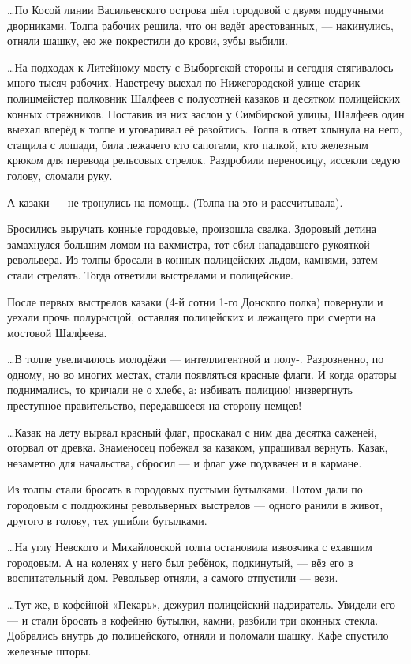…По Косой линии Васильевского острова шёл городовой с двумя подручными
дворниками. Толпа рабочих решила, что он ведёт арестованных, — накинулись,
отняли шашку, ею же покрестили до крови, зубы выбили.

…На подходах к Литейному мосту с Выборгской стороны и сегодня стягивалось много
тысяч рабочих. Навстречу выехал по Нижегородской улице старик-полицмейстер
полковник Шалфеев с полусотней казаков и десятком полицейских конных
стражников. Поставив из них заслон у Симбирской улицы, Шалфеев один выехал
вперёд к толпе и уговаривал её разойтись. Толпа в ответ хлынула на него,
стащила с лошади, била лежачего кто сапогами, кто палкой, кто железным крюком
для перевода рельсовых стрелок. Раздробили переносицу, иссекли седую голову,
сломали руку.

А казаки — не тронулись на помощь. (Толпа на это и рассчитывала).

Бросились выручать конные городовые, произошла свалка. Здоровый детина
замахнулся большим ломом на вахмистра, тот сбил нападавшего рукояткой
револьвера. Из толпы бросали в конных полицейских льдом, камнями, затем стали
стрелять. Тогда ответили выстрелами и полицейские.

После первых выстрелов казаки (4-й сотни 1-го Донского полка) повернули и
уехали прочь полурысцой, оставляя полицейских и лежащего при смерти на мостовой
Шалфеева.

…В толпе увеличилось молодёжи — интеллигентной и полу-. Разрозненно, по одному,
но во многих местах, стали появляться красные флаги. И когда ораторы
поднимались, то кричали не о хлебе, а: избивать полицию! низвергнуть преступное
правительство, передавшееся на сторону немцев!

…Казак на лету вырвал красный флаг, проскакал с ним два десятка саженей,
оторвал от древка. Знаменосец побежал за казаком, упрашивал вернуть. Казак,
незаметно для начальства, сбросил — и флаг уже подхвачен и в кармане.

Из толпы стали бросать в городовых пустыми бутылками. Потом дали по городовым с
полдюжины револьверных выстрелов — одного ранили в живот, другого в голову, тех
ушибли бутылками.

…На углу Невского и Михайловской толпа остановила извозчика с ехавшим
городовым. А на коленях у него был ребёнок, подкинутый, — вёз его в
воспитательный дом. Револьвер отняли, а самого отпустили — вези.

…Тут же, в кофейной «Пекарь», дежурил полицейский надзиратель. Увидели его — и
стали бросать в кофейню бутылки, камни, разбили три оконных стекла. Добрались
внутрь до полицейского, отняли и поломали шашку. Кафе спустило железные шторы.

